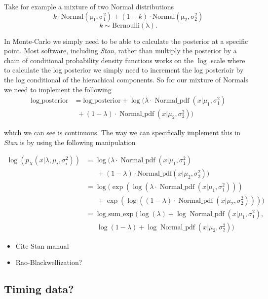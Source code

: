 \documentclass{article}
\begin{document}
Take for example a mixture of two Normal distributions
\begin{equation}
  k \cdot \operatorname{Normal(\mu_1, \sigma_1^2)} + (1 - k) \cdot \operatorname{Normal(\mu_2, \sigma_2^2)}
\end{equation} 
\begin{equation}
  k \sim \operatorname{Bernoulli(\lambda)}.
\end{equation}

In Monte-Carlo we simply need to be able to calculate the posterior at a specific point. Most software, including \emph{Stan}, rather than multiply the posterior by a chain of conditional probability density functions works on the $\log$ scale where to calculate the log posterior we simply need to increment the log posterioir by the log conditional of the hierachical components. So for our mixture of Normals we need to implement the following
\begin{align}
  \text{log\_posterior} &= \text{log\_posterior} + \log(\lambda \cdot \operatorname{Normal\_pdf}(x | \mu_1, \sigma_1^2)  \nonumber \\
                   & \ \ + (1 - \lambda) \cdot \operatorname{Normal\_pdf}(x | \mu_2, \sigma_2^2))
\end{align}

which we can see is continuous. The way we can specifically implement this in \emph{Stan} is by using the following manipulation

\begin{align}
\log(p_X(x | \lambda, \mu_i, \sigma^2_i)) &= \log(\lambda \cdot \operatorname{Normal\_pdf}(x | \mu_1, \sigma_1^2)  \nonumber \\
& \ \ \ \ \ \ \ + (1 - \lambda) \cdot \text{Normal\_pdf}(x | \mu_2, \sigma_2^2)) \\
&= \log(\exp(\log(\lambda \cdot \operatorname{Normal\_pdf}(x | \mu_1, \sigma_1^2)))  \nonumber \\
& \ \ \ \ \ \ \ + \exp(\log((1 - \lambda) \cdot \operatorname{Normal\_pdf}(x | \mu_2, \sigma_2^2)))) \\
&= \operatorname{log\_sum\_exp}(\log(\lambda) + \log\operatorname{Normal\_pdf}(x | \mu_1, \sigma_1^2),  \nonumber \\
& \ \ \ \ \ \ \ \log(1 - \lambda) + \log\operatorname{Normal\_pdf}(x | \mu_2, \sigma_2^2))
\end{align} 


\begin{itemize}

\item Cite Stan manual

\item Rao-Blackwellization? 

\end{itemize}

\subsection{Timing data?}


{}
\end{document}
